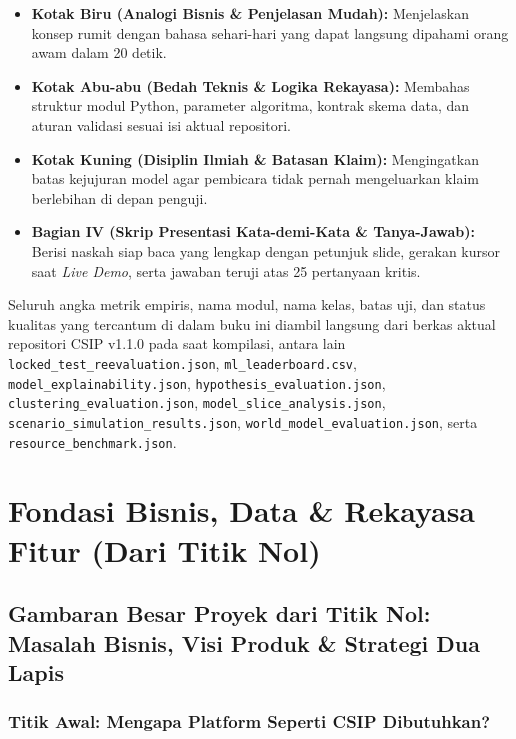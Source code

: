 \documentclass[11pt,a4paper,oneside]{book}
\newcommand{\code}[1]{{\small\nolinkurl{#1}}}
\begin{document}
\begin{itemize}
  \item \textbf{Kotak Biru (Analogi Bisnis \& Penjelasan Mudah):} Menjelaskan konsep rumit dengan bahasa sehari-hari yang dapat langsung dipahami orang awam dalam 20 detik.
  \item \textbf{Kotak Abu-abu (Bedah Teknis \& Logika Rekayasa):} Membahas struktur modul Python, parameter algoritma, kontrak skema data, dan aturan validasi sesuai isi aktual repositori.
  \item \textbf{Kotak Kuning (Disiplin Ilmiah \& Batasan Klaim):} Mengingatkan batas kejujuran model agar pembicara tidak pernah mengeluarkan klaim berlebihan di depan penguji.
  \item \textbf{Bagian IV (Skrip Presentasi Kata-demi-Kata \& Tanya-Jawab):} Berisi naskah siap baca yang lengkap dengan petunjuk slide, gerakan kursor saat \emph{Live Demo}, serta jawaban teruji atas 25 pertanyaan kritis.
\end{itemize}

Seluruh angka metrik empiris, nama modul, nama kelas, batas uji, dan status kualitas yang tercantum di dalam buku ini diambil langsung dari berkas aktual repositori CSIP v1.1.0 pada saat kompilasi, antara lain \code{locked_test_reevaluation.json}, \code{ml_leaderboard.csv}, \code{model_explainability.json}, \code{hypothesis_evaluation.json}, \code{clustering_evaluation.json}, \code{model_slice_analysis.json}, \code{scenario_simulation_results.json}, \code{world_model_evaluation.json}, serta \code{resource_benchmark.json}.

\tableofcontents
\listoftables

\mainmatter

\part{Fondasi Bisnis, Data \& Rekayasa Fitur (Dari Titik Nol)}

\chapter{Gambaran Besar Proyek dari Titik Nol: Masalah Bisnis, Visi Produk \& Strategi Dua Lapis}

\section{Titik Awal: Mengapa Platform Seperti CSIP Dibutuhkan?}
\end{document}
